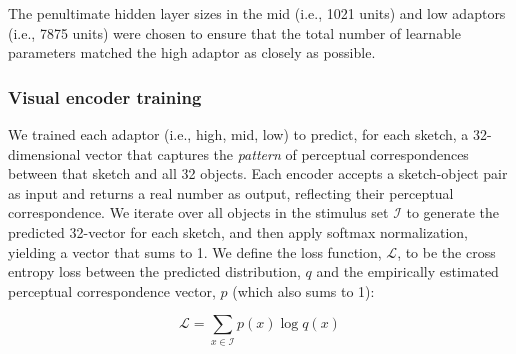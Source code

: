 \documentclass[9pt,twocolumn,twoside]{pnas-new}
\begin{document}
{The penultimate hidden layer sizes in the mid (i.e., 1021 units) and low adaptors (i.e., 7875 units) were chosen to ensure that the total number of learnable parameters matched the high adaptor as closely as possible. 


\subsubsection*{Visual encoder training}

We trained each adaptor (i.e., high, mid, low) to predict, for each sketch, a 32-dimensional vector that captures the \textit{pattern} of perceptual correspondences between that sketch and all 32 objects. 
Each encoder accepts a sketch-object pair as input and returns a real number as output, 
reflecting their perceptual correspondence.
We iterate over all objects in the stimulus set $\mathcal{I}$ to generate the predicted 32-vector for each sketch, and then apply softmax normalization, yielding a vector that sums to 1. 
We define the loss function, $\mathcal{L}$, to be the cross entropy loss between the predicted distribution, $q$ and the empirically estimated perceptual correspondence vector, $p$ (which also sums to 1):

\begin{equation}
    \mathcal{L} = \sum_{x \in \mathcal{I}} p(x)\log q(x)
    \label{eqn:cross_entropy}
\end{equation}


}
\end{document}
